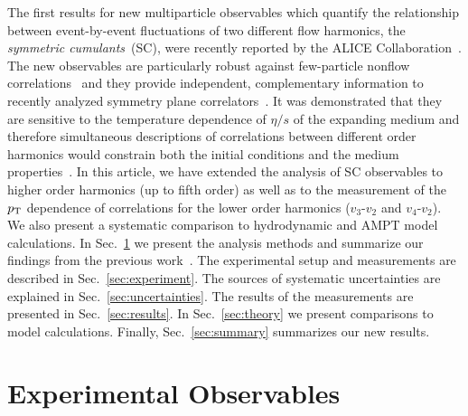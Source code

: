 The first results for new multiparticle observables which quantify the relationship between event-by-event fluctuations of two different flow harmonics, the \textit{symmetric cumulants}~(SC), were recently reported by the ALICE Collaboration~\cite{ALICE:2016kpq}.
The new observables are particularly robust against few-particle nonflow correlations~\cite{Aamodt:2010pa} and they provide independent, complementary information to recently analyzed symmetry plane correlators~\cite{Aad:2014fla}. 
It was demonstrated that they are sensitive to the temperature dependence of $\eta/s$ of the expanding medium and therefore simultaneous descriptions of correlations between different order harmonics would constrain both the initial conditions and the medium properties~\cite{ALICE:2016kpq,Zhu:2016puf}.
In this article, we have extended the analysis of SC observables to higher order harmonics (up to fifth order) as well as to the measurement of the $p_{\rm T}$ dependence of correlations for the lower order harmonics ($v_3$-$v_2$ and $v_4$-$v_2$).  We also present a systematic comparison to hydrodynamic and AMPT model calculations.
In Sec.~\ref{sec:method} we present the analysis methods and summarize our findings from the previous work~\cite{ALICE:2016kpq}. The experimental setup and measurements are described in Sec.~\ref{sec:experiment}. The sources of systematic uncertainties are explained in Sec.~\ref{sec:uncertainties}. The results of the measurements are presented in Sec.~\ref{sec:results}. In Sec.~\ref{sec:theory} we present comparisons to model calculations.
Finally, Sec.~\ref{sec:summary} summarizes our new results.
 
\section{Experimental Observables}
\label{sec:method}

